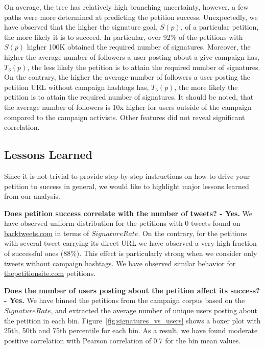 On average, the tree has relatively high branching uncertainty, however, a few paths were more determined at predicting the petition success.
Unexpectedly, we have observed that the higher the signature goal, $S(p)$, of a particular petition, the more likely it is to succeed. In particular, over 92\% of the petitions with $S(p)$ higher 100K obtained the required number of signatures.
Moreover, the higher the average number of followers a user posting about a give campaign has, $T_3(p)$, the less likely the petition is to attain the required number of signatures.
On the contrary, the higher the average number of followers a user posting the petition URL without campaign hashtags has, $T_5(p)$, the more likely the petition is to attain the required number of signatures.
It should be noted, that the average number of followers is 10x higher for users outside of the campaign compared to the campaign activists. Other features did not reveal significant correlation.

\subsection{Lessons Learned}
\label{sec:discussion}
Since it is not trivial to provide step-by-step instructions on how to drive your petition to success in general, we would like to highlight major lessons learned from our analysis.

\textbf{Does petition success correlate with the number of tweets? - Yes.} We have observed uniform distribution for the petitions with 0 tweets found on \url{backtweets.com} in terms of $SignatureRate$. On the contrary, for the petitions with several tweet carrying its direct URL we have observed a very high fraction of successful ones (88\%). This effect is particularly strong when we consider only tweets without campaign hashtags. We have observed similar behavior for \url{thepetitionsite.com} petitions.

\textbf{Does the number of users posting about the petition affect its success? - Yes.} We have binned the petitions from the campaign corpus based on the $SignatureRate$, and extracted the average number of unique users posting about the petition in each bin. Figure~\ref{fig:signatures_vs_users} shows a boxer plot with 25th, 50th and 75th percentile for each bin. As a result, we have found moderate positive correlation with Pearson correlation of 0.7 for the bin mean values.

